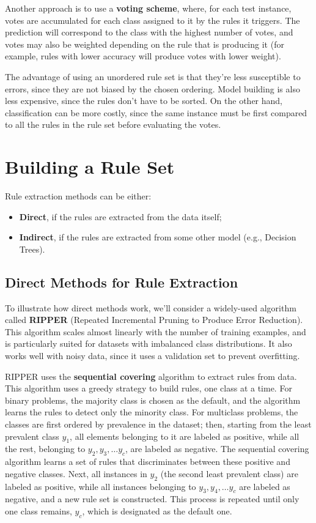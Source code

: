 Another approach is to use a \textbf{voting scheme}, where, for each test instance, votes are accumulated for each class assigned to it by the rules it triggers. The prediction will correspond to the class with the highest number of votes, and votes may also be weighted depending on the rule that is producing it (for example, rules with lower accuracy will produce votes with lower weight).

The advantage of using an unordered rule set is that they're less susceptible to errors, since they are not biased by the chosen ordering. Model building is also less expensive, since the rules don't have to be sorted. On the other hand, classification can be more costly, since the same instance must be first compared to all the rules in the rule set before evaluating the votes.

\section{Building a Rule Set}

Rule extraction methods can be either:
\begin{itemize}
    \item \textbf{Direct}, if the rules are extracted from the data itself;
    \item \textbf{Indirect}, if the rules are extracted from some other model (e.g., Decision Trees).
\end{itemize}

\subsection{Direct Methods for Rule Extraction}

To illustrate how direct methods work, we'll consider a widely-used algorithm called \textbf{RIPPER} (Repeated Incremental Pruning to Produce Error Reduction). This algorithm scales almost linearly with the number of training examples, and is particularly suited for datasets with imbalanced class distributions. It also works well with noisy data, since it uses a validation set to prevent overfitting.

RIPPER uses the \textbf{sequential covering} algorithm to extract rules from data. This algorithm uses a greedy strategy to build rules, one class at a time. For binary problems, the majority class is chosen as the default, and the algorithm learns the rules to detect only the minority class. For multiclass problems, the classes are first ordered by prevalence in the dataset; then, starting from the least prevalent class $y_1$, all elements belonging to it are labeled as positive, while all the rest, belonging to $y_2, y_3, \dots y_c$, are labeled as negative. The sequential covering algorithm learns a set of rules that discriminates between these positive and negative classes. Next, all instances in $y_2$ (the second least prevalent class) are labeled as positive, while all instances belonging to $y_3, y_4, \dots y_c$ are labeled as negative, and a new rule set is constructed. This process is repeated until only one class remains, $y_c$, which is designated as the default one.

